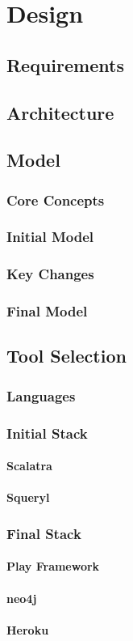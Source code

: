 \chapter{Design}
  \section{Requirements}
  \section{Architecture}
  \section{Model}
    \subsection{Core Concepts}
    \subsection{Initial Model}
    \subsection{Key Changes}
    \subsection{Final Model}
  \section{Tool Selection}
    \subsection{Languages}
    \subsection{Initial Stack}
      \subsubsection{Scalatra}
      \subsubsection{Squeryl}
    \subsection{Final Stack}
      \subsubsection{Play Framework}
      \subsubsection{neo4j}
      \subsubsection{Heroku}
